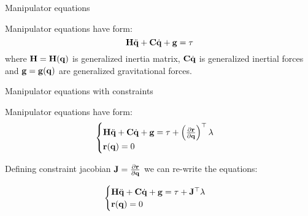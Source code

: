 \documentclass{beamer}
\begin{document}
\begin{frame}{Manipulator equations}
	\begin{flushleft}
		
		Manipulator equations have form:
		\begin{equation}
			\mathbf{H} \ddot{\mathbf{q}} + \mathbf{C} \dot{\mathbf{q}} + \mathbf{g} = \tau
		\end{equation}
		where $\mathbf{H}=\mathbf{H}(\mathbf{q})$ is generalized inertia matrix, $\mathbf{C}\dot{\mathbf{q}}$ is generalized inertial forces and $\mathbf{g}=\mathbf{g}(\mathbf{q})$ are generalized gravitational forces.
		
	\end{flushleft}
\end{frame}



\begin{frame}{Manipulator equations with constraints}
	\begin{flushleft}
		
		Manipulator equations have form:
		\begin{equation}
			\begin{cases}
				\mathbf{H} \ddot{\mathbf{q}} + \mathbf{C} \dot{\mathbf{q}} + \mathbf{g} = \tau + \left( \frac{\partial \mathbf{r}}{\partial  \mathbf{q}} \right)^\top \lambda
				\\
				\mathbf{r}(\mathbf{q}) = 0
			\end{cases}
		\end{equation}

		Defining constraint jacobian $\mathbf{J} = \frac{\partial \mathbf{r}}{\partial  \mathbf{q}}$ we can re-write the equations:
		
		\begin{equation}
	\begin{cases}
		\mathbf{H} \ddot{\mathbf{q}} + \mathbf{C} \dot{\mathbf{q}} + \mathbf{g} = \tau + \mathbf{J}^\top \lambda
		\\
		\mathbf{r}(\mathbf{q}) = 0
	\end{cases}
\end{equation}
		
	\end{flushleft}
\end{frame}
\end{document}

